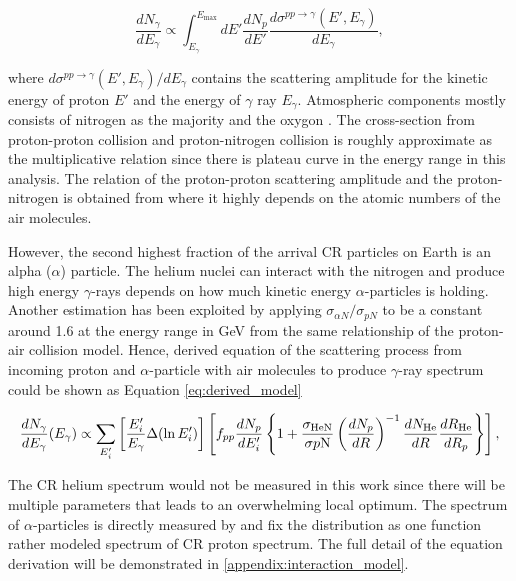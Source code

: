 \begin{equation}
    \frac{dN_\gamma}{dE_\gamma} \propto \int^{E_{\text{max}}}_{E_\gamma} dE'\frac{dN_p}{dE'} \frac{d\sigma^{pp\rightarrow\gamma}(E',E_\gamma)}{dE_\gamma},
    \label{eq:KO_model}
\end{equation}

where $d\sigma^{pp\rightarrow\gamma}(E',E_\gamma)/dE_\gamma$ contains 
the scattering amplitude
for the kinetic energy of proton $E'$ and the
energy of $\gamma$ ray $E_\gamma$.
Atmospheric components mostly consists 
of nitrogen as the majority and the oxygon \citep{atmosCompos}. The cross-section from 
proton-proton collision and proton-nitrogen collision is roughly 
approximate as the multiplicative relation since there is plateau 
curve in the energy range in this analysis. The relation of the proton-proton 
scattering amplitude and the proton-nitrogen is obtained from \cite{WAtwater}
where it highly depends on the atomic numbers of the air molecules. 

However, the second highest fraction of the arrival CR particles on 
Earth is an alpha ($\alpha$) particle. The helium nuclei can interact with the nitrogen and produce high energy $\gamma$-rays depends on
how much kinetic energy $\alpha$-particles is holding. Another 
estimation has been exploited by applying $\sigma_{\alpha N}/\sigma_{pN}$
to be a constant around 1.6 at the energy range in GeV from 
the same relationship of the proton-air collision model. Hence, derived
equation of the scattering process from incoming 
proton and $\alpha$-particle with air molecules to produce $\gamma$-ray
spectrum could be shown as Equation \ref{eq:derived_model}

\begin{equation}
    \frac{dN_{\gamma}}{dE_\gamma}(E_\gamma) \propto
    \sum_{E'_i}\left[\frac{E'_i}{E_{\gamma}}\Delta(\ln E'_i) \right]
    \left[ 
        f_{pp}\frac{dN_p}{dE'_i}
        \left\{
            1+\frac{\sigma_{\text{HeN}}}{\sigma{p\rm N}}\left(\frac{dN_p}{dR}\right)^{-1} \frac{dN_{\text{He}}}{dR} \frac{dR_{\text{He}}}{dR_p} 
        \right\}
    \right]
    ,\label{eq:derived_model}
\end{equation}

The CR helium spectrum would not be measured in this work since there will be multiple parameters that leads to an overwhelming 
local optimum. The spectrum of $\alpha$-particles is directly measured 
by \cite{AMS-02Helium} and fix the distribution as one function rather 
modeled spectrum of CR proton spectrum. The full detail of the 
equation derivation will be demonstrated in \ref{appendix:interaction_model}.


